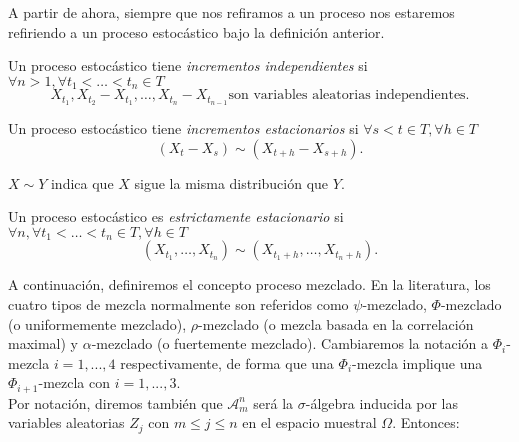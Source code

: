 \begin{itemize}
A partir de ahora, siempre que nos refiramos a un proceso nos estaremos refiriendo a un proceso estocástico bajo la definición anterior. \\

\begin{definicion}
  Un proceso estocástico tiene \emph{incrementos independientes} si $\forall n > 1, \forall t_1 < \ldots < t_n \in T$ $$X_{t_1}, X_{t_2} - X_{t_1}, \ldots, X_{t_n} - X_{t_{n-1}} \text{son variables aleatorias independientes.}$$
\end{definicion}

\begin{definicion}
  Un proceso estocástico tiene \emph{incrementos estacionarios} si $\forall s < t \in T, \forall h\in T$  $$(X_t - X_s) \sim (X_{t+h} - X_{s+h}).$$
\end{definicion}

\begin{nota}
  $X \sim Y$ indica que $X$ sigue la misma distribución que $Y$.
\end{nota}

\begin{definicion}
  Un proceso estocástico es \emph{estrictamente estacionario} si $\forall n, \forall t_1 < \ldots < t_n \in T, \forall h \in T$ $$(X_{t_1}, \ldots, X_{t_n}) \sim (X_{t_1 + h}, \ldots, X_{t_n + h}).$$
\end{definicion}

A continuación, definiremos el concepto proceso mezclado. En la literatura, los cuatro tipos de mezcla normalmente son referidos como $\psi$-mezclado, $\Phi$-mezclado (o uniformemente mezclado), $\rho$-mezclado (o mezcla basada en la correlación maximal) y $\alpha$-mezclado (o fuertemente mezclado). Cambiaremos la notación a $\Phi_i$-mezcla $i=1,...,4$ respectivamente, de forma que una $\Phi_i$-mezcla implique una $\Phi_{i+1}$-mezcla con $i=1,...,3$.\\

Por notación, diremos también que $\mathscr{A}_m^n$ será la $\sigma$-álgebra inducida por las variables aleatorias $Z_j$ con $m\le j \le n$ en el espacio muestral $\Omega$. Entonces:\\


\end{itemize}
